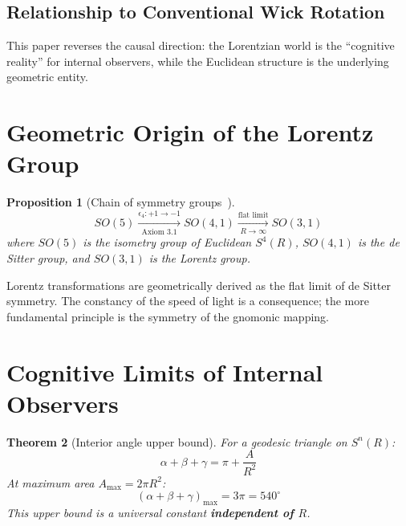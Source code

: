 \documentclass[12pt,a4paper]{article}
\newtheorem{theorem}{Theorem}[section]
\newtheorem{proposition}[theorem]{Proposition}
\begin{document}
\subsection{Relationship to Conventional Wick Rotation}

This paper reverses the causal direction: the Lorentzian world is the ``cognitive reality'' for internal observers, while the Euclidean structure is the underlying geometric entity.

\section{Geometric Origin of the Lorentz Group}

\begin{proposition}[Chain of symmetry groups~{\rm\cite{Wald1984,Guo2004}}]\label{prop:chain}
\begin{equation}
SO(5) \xrightarrow[\text{Axiom~3.1}]{\epsilon_4: +1 \to -1} SO(4,1) \xrightarrow[R \to \infty]{\text{flat limit}} SO(3,1) \tag{4.1}
\end{equation}
where $SO(5)$ is the isometry group of Euclidean $S^4(R)$, $SO(4,1)$ is the de Sitter group, and $SO(3,1)$ is the Lorentz group.
\end{proposition}

Lorentz transformations are geometrically derived as the flat limit of de Sitter symmetry. The constancy of the speed of light is a consequence; the more fundamental principle is the symmetry of the gnomonic mapping.

\section{Cognitive Limits of Internal Observers}

\begin{theorem}[Interior angle upper bound]\label{thm:angle}
For a geodesic triangle on $S^n(R)$:
\begin{equation}
\alpha + \beta + \gamma = \pi + \frac{A}{R^2} \tag{5.1}
\end{equation}
At maximum area $A_{\max} = 2\pi R^2$:
\begin{equation}
(\alpha + \beta + \gamma)_{\max} = 3\pi = 540^\circ \tag{5.2}
\end{equation}
This upper bound is a universal constant \textbf{independent of $R$}.
\end{theorem}
\end{document}
